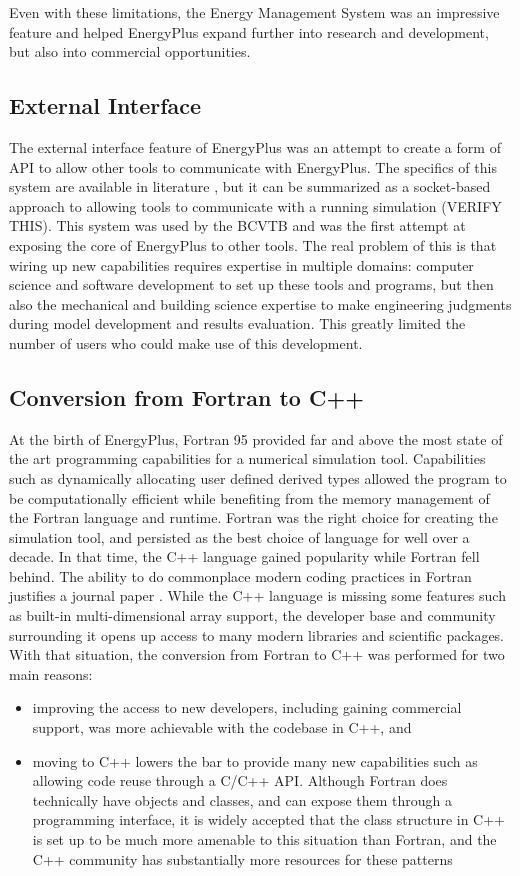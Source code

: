 \documentclass[5p]{elsarticle}
\begin{document}
Even with these limitations, the Energy Management System was an impressive feature and helped EnergyPlus expand further into research and development, but also into commercial opportunities.

  \subsection{External Interface}
The external interface feature of EnergyPlus was an attempt to create a form of API to allow other tools to communicate with EnergyPlus.  The specifics of this system are available in literature \cite{Nouidui2014}, but it can be summarized as a socket-based approach to allowing tools to communicate with a running simulation (VERIFY THIS).  This system was used by the BCVTB \cite{Pang2011} and was the first attempt at exposing the core of EnergyPlus to other tools.  The real problem of this is that wiring up new capabilities requires expertise in multiple domains: computer science and software development to set up these tools and programs, but then also the mechanical and building science expertise to make engineering judgments during model development and results evaluation.  This greatly limited the number of users who could make use of this development.

  \subsection{Conversion from Fortran to C++}
At the birth of EnergyPlus, Fortran 95 provided far and above the most state of the art programming capabilities for a numerical simulation tool.  Capabilities such as dynamically allocating user defined derived types allowed the program to be computationally efficient while benefiting from the memory management of the Fortran language and runtime.  Fortran was the right choice for creating the simulation tool, and persisted as the best choice of language for well over a decade. In that time, the C++ language gained popularity while Fortran fell behind.  The ability to do commonplace modern coding practices in Fortran justifies a journal paper \cite{Oezturan2015}.  While the C++ language is missing some features such as built-in multi-dimensional array support, the developer base and community surrounding it opens up access to many modern libraries and scientific packages.  With that situation, the conversion from Fortran to C++ was performed for two main reasons:
\begin{itemize}
  \item improving the access to new developers, including gaining commercial support, was more achievable with the codebase in C++, and 
  \item moving to C++ lowers the bar to provide many new capabilities such as allowing code reuse through a C/C++ API.  Although Fortran does technically have objects and classes, and can expose them through a programming interface, it is widely accepted that the class structure in C++ is set up to be much more amenable to this situation than Fortran, and the C++ community has substantially more resources for these patterns
\end{itemize}
\end{document}
